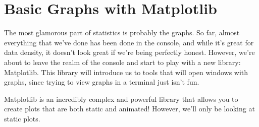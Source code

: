 \section{Basic Graphs with Matplotlib}
The most glamorous part of statistics is probably the graphs. So far, almost everything that we've done has been done in the console, and while it's great for data density, it doesn't look great if we're being perfectly honest. However, we're about to leave the realm of the console and start to play with a new library: Matplotlib. This library will introduce us to tools that will open windows with graphs, since trying to view graphs in a terminal just isn't fun.\par
{}
Matplotlib is an incredibly complex and powerful library that allows you to create plots that are both static and animated! However, we'll only be looking at static plots.